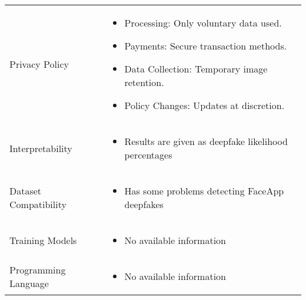 \begin{table}[htpb]
\begin{tabularx}{\textwidth}{l X}
		Privacy Policy               & \begin{itemize}[nosep,nolistsep,noitemsep]
			                               \item Processing: Only voluntary data used.
			                               \item Payments: Secure transaction methods.
			                               \item Data Collection: Temporary image retention.
			                               \item Policy Changes: Updates at discretion.
		                               \end{itemize}           \\
		Interpretability             & \begin{itemize}[nosep,nolistsep,noitemsep]
			                               \item Results are given as deepfake likelihood percentages
		                               \end{itemize}  \\
		Dataset Compatibility        & \begin{itemize}[nosep,nolistsep,noitemsep]
			                               \item Has some problems detecting FaceApp deepfakes
		                               \end{itemize}         \\
		Training Models              & \begin{itemize}[nosep,nolistsep,noitemsep]
			                               \item No available information
		                               \end{itemize}                  \\
		Programming Language         & \begin{itemize}[nosep,nolistsep,noitemsep]
			                               \item No available information
		                               \end{itemize}                  \\
		\bottomrule
	\end{tabularx}
\end{table}

